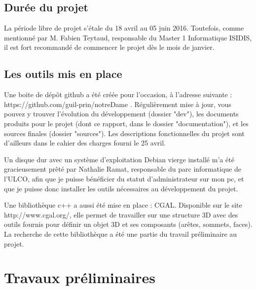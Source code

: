 \documentclass[a4paper,french]{report}
\begin{document}
		\section{Durée du projet}
			La période libre de projet s'étale du 18 avril au 05 juin 2016. Toutefois, comme mentionné par M. Fabien Teytaud, responsable du Master 1 Informatique ISIDIS, il est fort recommandé de commencer le projet dès le mois de janvier.
		\section{Les outils mis en place}
			Une boite de dépôt github a été créée pour l'occasion, à l'adresse suivante :  https://github.com/guil-prin/notreDame . Régulièrement mise à jour, vous pouvez y trouver l'évolution du développement (dossier "dev"), les documents produits pour le projet (dont ce rapport, dans le dossier "documentation"), et les sources finales (dossier "sources"). Les descriptions fonctionnelles du projet sont d'ailleurs dans le cahier des charges fourni le 25 avril. \par
			Un disque dur avec un système d'exploitation Debian vierge installé m'a été gracieusement prêté par Nathalie Ramat, responsable du parc informatique de l'ULCO, afin que je puisse bénéficier du statut d'administrateur sur mon pc, et que je puisse donc installer les outils nécessaires au développement du projet. \par
			Une bibliothèque c++ a aussi été mise en place : CGAL. Disponible sur le site http://www.cgal.org/, elle permet de travailler sur une structure 3D avec des outils fournis pour définir un objet 3D et ses composants (arêtes, sommets, faces). La recherche de cette bibliothèque a été une partie du travail préliminaire au projet.
			
	\chapter{Travaux préliminaires}
\end{document}
